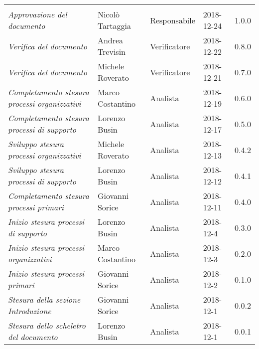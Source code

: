 \newpage 
\section*{}
\begin{table}[H]
	\centering
	\begin{tabular}{p{4cm}|C{3cm}|C{3cm}|R{2.5cm}|R{2cm}}
		
		 & & & & \\
		
		
		\emph{Approvazione del documento} & Nicolò Tartaggia & Responsabile & 2018-12-24 & 1.0.0 \\
		\hline
		
		\emph{Verifica del documento} & Andrea Trevisin & Verificatore & 2018-12-22 & 0.8.0 \\
		\hline
		
		\emph{Verifica del documento} & Michele Roverato & Verificatore & 2018-12-21 & 0.7.0 \\
		\hline
		
		\emph{Completamento stesura processi organizzativi} & Marco Costantino & Analista & 2018-12-19 & 0.6.0 \\
		\hline
		
		\emph{Completamento stesura processi di supporto} & Lorenzo Busin & Analista & 2018-12-17 & 0.5.0 \\
		\hline
		
		\emph{Sviluppo stesura processi organizzativi} & Michele Roverato & Analista & 2018-12-13 & 0.4.2 \\
		\hline
		
		\emph{Sviluppo stesura processi di supporto} & Lorenzo Busin & Analista & 2018-12-12 & 0.4.1 \\
		\hline
		
		\emph{Completamento stesura processi primari} & Giovanni Sorice & Analista & 2018-12-11 & 0.4.0 \\
		\hline
		
		\emph{Inizio stesura processi di supporto} & Lorenzo Busin & Analista & 2018-12-4 & 0.3.0 \\
		\hline
		
		\emph{Inizio stesura processi organizzativi} & Marco Costantino & Analista & 2018-12-3 & 0.2.0 \\
		\hline
		
		\emph{Inizio stesura processi primari} & Giovanni Sorice & Analista & 2018-12-2 & 0.1.0 \\
		\hline
		
		\emph{Stesura della sezione Introduzione} & Giovanni Sorice & Analista & 2018-12-1 & 0.0.2 \\
		\hline
		
		\emph{Stesura dello scheletro del documento} & Lorenzo Busin & Analista & 2018-12-1 & 0.0.1 \\
		
	\end{tabular}
	
\end{table}


\clearpage